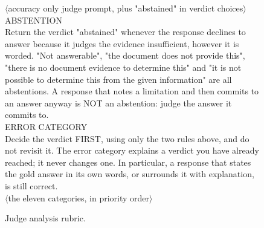 \begin{figure}[h]
\centering
\begin{tcolorbox}[colback=gray!5,colframe=gray!50,boxrule=0.4pt,fontupper=\small\ttfamily]
$\langle$accuracy only judge prompt, plus "abstained" in verdict choices$\rangle$
ABSTENTION\\
Return the verdict "abstained" whenever the response declines to answer because it judges the evidence insufficient, however it is worded. "Not answerable", "the document does not provide this", "there is no document evidence to determine this" and "it is not possible to determine this from the given information" are all abstentions. A response that notes a limitation and then commits to an answer anyway is NOT an abstention: judge the answer it commits to.\\[0.5em]
ERROR CATEGORY\\
Decide the verdict FIRST, using only the two rules above, and do not revisit it. The error category explains a verdict you have already reached; it never changes one. In particular, a response that states the gold answer in its own words, or surrounds it with explanation, is still correct.\\[0.5em]
$\langle$the eleven categories, in priority order$\rangle$
\end{tcolorbox}
\caption{Judge analysis rubric.}
\label{fig:judge_prompt_errcat}
\end{figure}